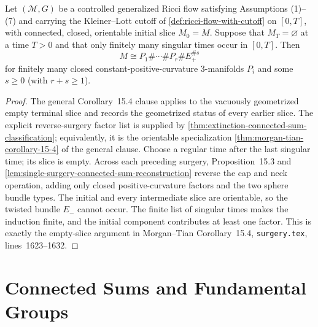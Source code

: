 \begin{theorem}
\label{thm:morgan-tian-corollary-15-4-empty}
\notready
Let $({\mathcal M},G)$ be a controlled generalized Ricci flow satisfying
Assumptions (1)--(7) and carrying the Kleiner--Lott cutoff of
\ref{def:ricci-flow-with-cutoff} on $[0,T]$, with connected, closed,
orientable initial slice $M_0=M$.  Suppose
that $M_T=\varnothing$ at a time $T>0$ and that only finitely many singular
times occur in $[0,T]$.  Then
\[
 M\cong P_1\#\cdots\#P_r\#E_+^{\# s}
\]
for finitely many closed constant-positive-curvature $3$-manifolds $P_i$ and
some $s\ge0$ (with $r+s\ge1$).
\end{theorem}

\begin{proof}
The general Corollary~15.4 clause applies to the vacuously geometrized empty
terminal slice and records the geometrized status of every earlier slice.
The explicit reverse-surgery factor list is supplied by
\ref{thm:extinction-connected-sum-classification}; equivalently, it is the
orientable specialization
\ref{thm:morgan-tian-corollary-15-4} of the general clause.  Choose a regular
time after the last singular time; its slice is empty.  Across
each preceding surgery, Proposition~15.3 and
\ref{lem:single-surgery-connected-sum-reconstruction} reverse the cap and neck
operation, adding only closed positive-curvature factors and the two sphere
bundle types.  The initial and every intermediate slice are orientable, so the
twisted bundle $E_-$ cannot occur.  The finite list of singular times makes the
induction finite, and the initial component contributes at least one factor.
This is exactly the empty-slice argument in Morgan--Tian Corollary~15.4,
\texttt{surgery.tex}, lines~1623--1632.
\end{proof}

\section{Connected Sums and Fundamental Groups}

